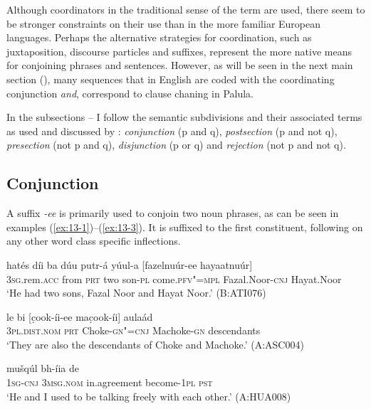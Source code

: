 Although coordinators in the traditional sense of the term are used, there seem to be stronger constraints on their use than in the more familiar European languages. Perhaps the alternative strategies for coordination, such as juxtaposition, discourse particles and suffixes, represent the more native means for conjoining phrases and sentences. However, as will be seen in the next main section (), many sequences that in English are coded with the coordinating conjunction \textit{and}, correspond to clause chaning in Palula.



In the subsections -- I follow the semantic subdivisions and their associated terms as used and discussed by \citet{payne1985}: \textit{conjunction} (p and q), \textit{postsection} (p and not q), \textit{presection} (not p and q), \textit{disjunction} (p or q) and \textit{rejection} (not p and not q).


\subsection{Conjunction}
\label{subsec:13-2-1}

 A suffix \textit{-ee} is primarily used to conjoin two noun phrases, as can be seen in examples (\ref{ex:13-1})--(\ref{ex:13-3}). It is suffixed to the first constituent, following on any other word class specific inflections.

\begin{exe}
\ex
\label{ex:13-1}
\gll hatés díi ba dúu putr-á yúul-a [fazelnuúr-ee hayaatnuúr] \\
\textsc{3sg.}rem.\textsc{acc} from \textsc{prt} two son-\textsc{pl} come.\textsc{pfv"=mpl} Fazal.Noor-\textsc{cnj} Hayat.Noor \\
\glt `He had two sons, Fazal Noor and Hayat Noor.' (B:ATI076) 

\ex
\label{ex:13-2}
\gll le bi [c̣ook-íi-ee mac̣ook-íi] aulaád \\
\textsc{3pl.dist.nom} \textsc{prt} Choke-\textsc{gn"=cnj} Machoke-\textsc{gn} descendants  \\
\glt `They are also the descendants of Choke and Machoke.' (A:ASC004)

\ex
\label{ex:13-3}
\gll [máa-ee so] mušqúl bh-íia de  \\
\textsc{1sg}-\textsc{cnj} \textsc{3msg.nom} in.agreement become-\textsc{1pl} \textsc{pst} \\
\glt `He and I used to be talking freely with each other.' (A:HUA008) 
\end{exe}

